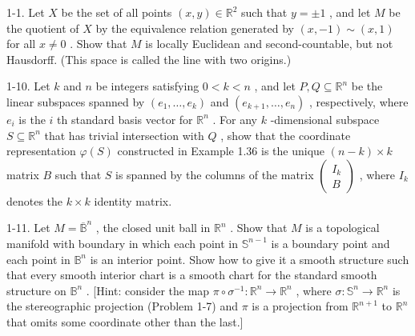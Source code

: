 %
%

\begin{exercise}
\label{prob:1-1}


1-1. Let $X$ be the set of all points $\left( {x, y}\right)  \in  {\mathbb{R}}^{2}$ such that $y =  \pm  1$ , and let $M$ be the quotient of $X$ by the equivalence relation generated by $\left( {x, - 1}\right)  \sim  \left( {x,1}\right)$ for all $x \neq  0$ . Show that $M$ is locally Euclidean and second-countable, but not Hausdorff. (This space is called the line with two origins.)
\end{exercise}

\begin{exercise}
\label{prob:1-10}


1-10. Let $k$ and $n$ be integers satisfying $0 < k < n$ , and let $P, Q \subseteq  {\mathbb{R}}^{n}$ be the linear subspaces spanned by $\left( {{e}_{1},\ldots ,{e}_{k}}\right)$ and $\left( {{e}_{k + 1},\ldots ,{e}_{n}}\right)$ , respectively, where ${e}_{i}$ is the $i$ th standard basis vector for ${\mathbb{R}}^{n}$ . For any $k$ -dimensional subspace $S \subseteq  {\mathbb{R}}^{n}$ that has trivial intersection with $Q$ , show that the coordinate representation $\varphi \left( S\right)$ constructed in Example 1.36 is the unique $\left( {n - k}\right)  \times  k$ matrix $B$ such that $S$ is spanned by the columns of the matrix $\left( \begin{matrix} {I}_{k} \\  B \end{matrix}\right)$ , where ${I}_{k}$ denotes the $k \times  k$ identity matrix.
\end{exercise}

\begin{exercise}
\label{prob:1-11}


1-11. Let $M = {\overline{\mathbb{B}}}^{n}$ , the closed unit ball in ${\mathbb{R}}^{n}$ . Show that $M$ is a topological manifold with boundary in which each point in ${\mathbb{S}}^{n - 1}$ is a boundary point and each point in ${\mathbb{B}}^{n}$ is an interior point. Show how to give it a smooth structure such that every smooth interior chart is a smooth chart for the standard smooth structure on ${\mathbb{B}}^{n}$ . [Hint: consider the map $\pi  \circ  {\sigma }^{-1} : {\mathbb{R}}^{n} \rightarrow  {\mathbb{R}}^{n}$ , where $\sigma  : {\mathbb{S}}^{n} \rightarrow  {\mathbb{R}}^{n}$ is the stereographic projection (Problem 1-7) and $\pi$ is a projection from ${\mathbb{R}}^{n + 1}$ to ${\mathbb{R}}^{n}$ that omits some coordinate other than the last.]
\end{exercise}

